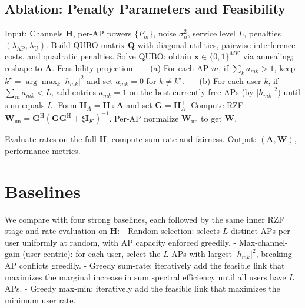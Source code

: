 \begin{algorithm}[htbp]
\subsection{Ablation: Penalty Parameters and Feasibility}
\caption{Two-Level QUBO-RZF with Feasibility Projection}
\begin{algorithmic}[1]
\State Input: Channels $\mathbf{H}$, per-AP powers $\{P_m\}$, noise $\sigma_n^2$, service level $L$, penalties $(\lambda_{\text{AP}},\lambda_{\text{U}})$.
\State Build QUBO matrix $\mathbf{Q}$ with diagonal utilities, pairwise interference costs, and quadratic penalties.
\State Solve QUBO: obtain $\mathbf{x}\in\{0,1\}^{MK}$ via annealing; reshape to $\mathbf{A}$.
\State Feasibility projection:
\State ~~~(a) For each AP $m$, if $\sum_k a_{mk}>1$, keep $k^\star=\arg\max_k |h_{mk}|^2$ and set $a_{mk}=0$ for $k\neq k^\star$.
\State ~~~(b) For each user $k$, if $\sum_m a_{mk}<L$, add entries $a_{mk}=1$ on the best currently-free APs (by $|h_{mk}|^2$) until sum equals $L$.
\State Form $\mathbf{H}_A=\mathbf{H}\circ \mathbf{A}$ and set $\mathbf{G}=\mathbf{H}_A^\top$.
\State Compute RZF $\mathbf{W}_{\mathrm{un}}=\mathbf{G}^\mathrm{H}(\mathbf{G}\mathbf{G}^\mathrm{H}+\xi \mathbf{I}_K)^{-1}$.
\State Per-AP normalize $\mathbf{W}_{\mathrm{un}}$ to get $\mathbf{W}$.

\State Evaluate rates on the full $\mathbf{H}$, compute sum rate and fairness.
\State Output: $(\mathbf{A},\mathbf{W})$, performance metrics.
\end{algorithmic}
\end{algorithm}

\section{Baselines}
We compare with four strong baselines, each followed by the same inner RZF stage and rate evaluation on $\mathbf{H}$:
- Random selection: selects $L$ distinct APs per user uniformly at random, with AP capacity enforced greedily.
- Max-channel-gain (user-centric): for each user, select the $L$ APs with largest $|h_{mk}|^2$, breaking AP conflicts greedily.
- Greedy sum-rate: iteratively add the feasible link that maximizes the marginal increase in sum spectral efficiency until all users have $L$ APs.
- Greedy max-min: iteratively add the feasible link that maximizes the minimum user rate.

